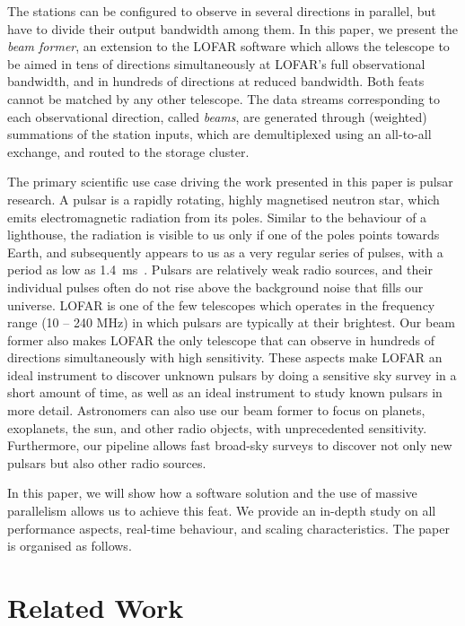 \documentclass{llncs}
\begin{document}
The stations can be configured to observe in several directions in parallel, but have to divide their output bandwidth among them. In this paper, we present the \emph{beam former}, an extension to the LOFAR software which allows the telescope to be aimed in tens of directions simultaneously at LOFAR's full observational bandwidth, and in hundreds of directions at reduced bandwidth. Both feats cannot be matched by any other telescope. The data streams corresponding to each observational direction, called \emph{beams}, are generated through (weighted) summations of the station inputs, which are demultiplexed using an all-to-all exchange, and routed to the storage cluster.

The primary scientific use case driving the work presented in this paper is pulsar research. A pulsar is a rapidly rotating, highly magnetised neutron star, which emits electromagnetic radiation from its poles. Similar to the behaviour of a lighthouse, the radiation is visible to us only if one of the poles points towards Earth, and subsequently appears to us as a very regular series of pulses, with a period as low as 1.4~ms~\cite{Hessels:06}. Pulsars are relatively weak radio sources, and their individual pulses often do not rise above the background noise that fills our universe. LOFAR is one of the few telescopes which operates in the frequency range (10 -- 240 MHz) in which pulsars are typically at their brightest. Our beam former also makes LOFAR the only telescope that can observe in hundreds of directions simultaneously with high sensitivity. These aspects make LOFAR an ideal instrument to discover unknown pulsars by doing a sensitive sky survey in a short amount of time, as well as an ideal instrument to study known pulsars in more detail. Astronomers can also use our beam former to focus on planets, exoplanets, the sun, and other radio objects, with unprecedented sensitivity. Furthermore, our pipeline allows fast broad-sky surveys to discover not only new pulsars but also other radio sources.

In this paper, we will show how a software solution and the use of massive parallelism allows us to achieve this feat. We provide an in-depth study on all performance aspects, real-time behaviour, and scaling characteristics. The paper is organised as follows.

\section{Related Work}
\end{document}
